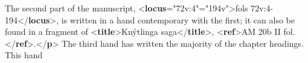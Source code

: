 \begin{shaded}
\mbox{}\newline 
{}\mbox{}\newline 
\hspace*{1em}The second part of the manuscript, {<\textbf{locus}\hspace*{1em}{from}="{72v:4}"\hspace*{1em}{to}="{194v}">}fols\mbox{}\newline 
\hspace*{1em}\hspace*{1em}\hspace*{1em}\hspace*{1em}\hspace*{1em}\hspace*{1em} 72v:4-194{</\textbf{locus}>}, is written in a hand contemporary with the first; it can also\mbox{}\newline 
\hspace*{1em}\hspace*{1em}\hspace*{1em}\hspace*{1em} be found in a fragment of {<\textbf{title}>}Knýtlinga saga{</\textbf{title}>}, {<\textbf{ref}>}AM 20b II\mbox{}\newline 
\hspace*{1em}\hspace*{1em}\hspace*{1em}\hspace*{1em}\hspace*{1em}\hspace*{1em} fol.{</\textbf{ref}>}.{</\textbf{p}>}\mbox{}\newline 
{}\mbox{}\newline 
{}\mbox{}\newline 
\hspace*{1em}The third hand has written the majority of the chapter headings. This hand\mbox{}\newline 

\end{shaded}
